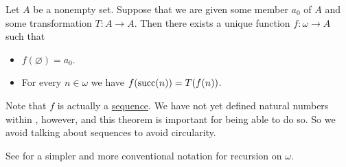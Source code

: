 \begin{theorem}\label{thm:omega_recursion}
  Let \( A \) be a nonempty set. Suppose that we are given some member \( a_0 \) of \( A \) and some transformation \( T: A \to A \). Then there exists a unique function \( f: \omega \to A \) such that
  \begin{itemize}
    \item \( f(\varnothing) = a_0 \).
    \item For every \( n \in \omega \) we have \( f(\operatorname{succ}(n)) = T(f(n)) \).
  \end{itemize}

  Note that \( f \) is actually a \hyperref[def:sequence]{sequence}. We have not yet defined natural numbers within , however, and this theorem is important for being able to do so. So we avoid talking about sequences to avoid circularity.

  See  for a simpler and more conventional notation for recursion on \( \omega \).
\end{theorem}
